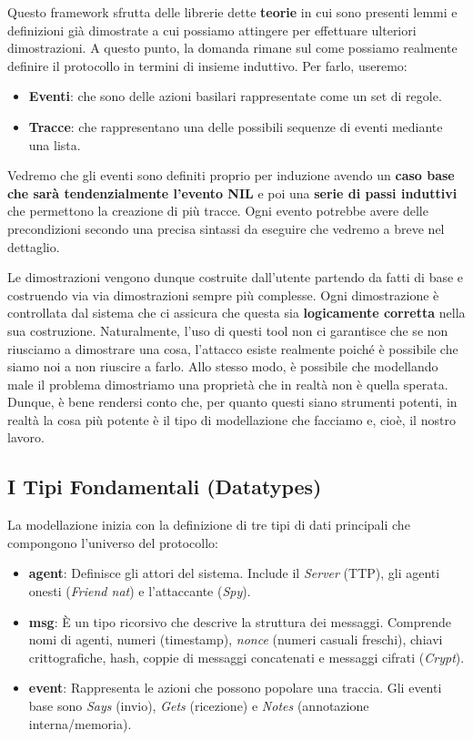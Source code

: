 Questo framework sfrutta delle librerie dette \textbf{teorie} in cui sono presenti lemmi e definizioni già dimostrate a cui possiamo attingere per effettuare ulteriori dimostrazioni. A questo punto, la domanda rimane sul come possiamo realmente definire il protocollo in termini di insieme induttivo. Per farlo, useremo:
\begin{itemize}
    \item \textbf{Eventi}: che sono delle azioni basilari rappresentate come un set di regole.
    \item \textbf{Tracce}: che rappresentano una delle possibili sequenze di eventi mediante una lista.
\end{itemize}
Vedremo che gli eventi sono definiti proprio per induzione avendo un \textbf{caso base che sarà tendenzialmente l'evento NIL} e poi una \textbf{serie di passi induttivi} che permettono la creazione di più tracce. Ogni evento potrebbe avere delle precondizioni secondo una precisa sintassi da eseguire che vedremo a breve nel dettaglio.

Le dimostrazioni vengono dunque costruite dall'utente partendo da fatti di base e costruendo via via dimostrazioni sempre più complesse. Ogni dimostrazione è controllata dal sistema che ci assicura che questa sia \textbf{logicamente corretta} nella sua costruzione. Naturalmente, l'uso di questi tool non ci garantisce che se non riusciamo a dimostrare una cosa, l'attacco esiste realmente poiché è possibile che siamo noi a non riuscire a farlo. Allo stesso modo, è possibile che modellando male il problema dimostriamo una proprietà che in realtà non è quella sperata. Dunque, è bene rendersi conto che, per quanto questi siano strumenti potenti, in realtà la cosa più potente è il tipo di modellazione che facciamo e, cioè, il nostro lavoro.

\subsection{I Tipi Fondamentali (Datatypes)}
La modellazione inizia con la definizione di tre tipi di dati principali che compongono l'universo del protocollo:

\begin{itemize}
    \item \textbf{agent}: Definisce gli attori del sistema. Include il \textit{Server} (TTP), gli agenti onesti (\textit{Friend nat}) e l'attaccante (\textit{Spy}).
    \item \textbf{msg}: È un tipo ricorsivo che descrive la struttura dei messaggi. Comprende nomi di agenti, numeri (timestamp), \textit{nonce} (numeri casuali freschi), chiavi crittografiche, hash, coppie di messaggi concatenati e messaggi cifrati (\textit{Crypt}).
    \item \textbf{event}: Rappresenta le azioni che possono popolare una traccia. Gli eventi base sono \textit{Says} (invio), \textit{Gets} (ricezione) e \textit{Notes} (annotazione interna/memoria).
\end{itemize}

